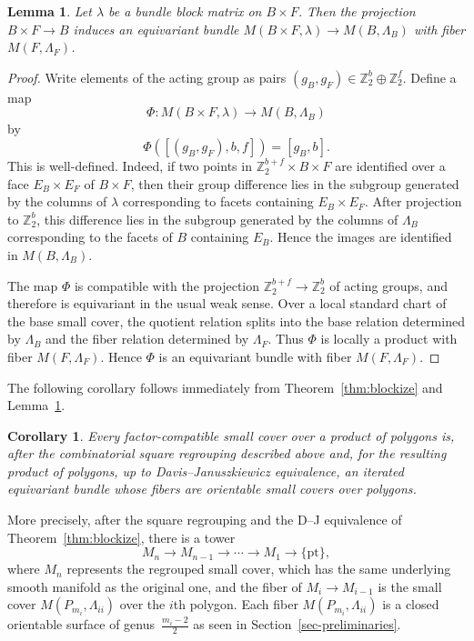 \documentclass{amsart}
\newtheorem{lemma}[theorem]{Lemma}
\newtheorem{corollary}[theorem]{Corollary}
\numberwithin{equation}{section}
\theoremstyle{definition}
\theoremstyle{remark}
\newcommand{\Z}{\mathbb Z}
\begin{document}
\begin{lemma}\label{lem:block-bundle-criterion}
    Let $\lambda$ be a bundle block matrix on $B\times F$.
    Then the projection $B\times F\to B$ induces an equivariant bundle $M(B\times F,\lambda) \to M(B,\Lambda_B)$ with fiber $M(F,\Lambda_F)$.
\end{lemma}

\begin{proof}
    Write elements of the acting group as pairs $(g_B,g_F)\in \Z_2^b\oplus\Z_2^f$.
    Define a map
    $$
        \Phi\colon M(B\times F,\lambda)\longrightarrow M(B,\Lambda_B)
    $$
    by
    $$
        \Phi([(g_B,g_F),b,f])=[g_B,b].
    $$
    This is well-defined.
    Indeed, if two points in $\Z_2^{b+f}\times B\times F$ are identified over a face $E_B\times E_F$ of $B\times F$, then their group difference lies in the subgroup generated by the columns of $\lambda$ corresponding to facets containing $E_B\times E_F$.
    After projection to $\Z_2^b$, this difference lies in the subgroup generated by the columns of $\Lambda_B$ corresponding to the facets of $B$ containing $E_B$.
    Hence the images are identified in $M(B,\Lambda_B)$.
    
    The map $\Phi$ is compatible with the projection $\Z_2^{b+f}\to \Z_2^b$ of acting groups, and therefore is equivariant in the usual weak sense.
    Over a local standard chart of the base small cover, the quotient relation splits into the base relation determined by $\Lambda_B$ and the fiber relation determined by $\Lambda_F$.
    Thus $\Phi$ is locally a product with fiber $M(F,\Lambda_F)$.
    Hence $\Phi$ is an equivariant bundle with fiber $M(F,\Lambda_F)$.
\end{proof}

The following corollary follows immediately from Theorem~\ref{thm:blockize} and Lemma~\ref{lem:block-bundle-criterion}.
\begin{corollary} \label{cor:iterated-equivariant-bundle}
    Every factor-compatible small cover over a product of polygons is, after the combinatorial square regrouping described above and, for the resulting product of polygons, up to Davis--Januszkiewicz equivalence, an iterated equivariant bundle whose fibers are orientable small covers over polygons.
\end{corollary}

More precisely, after the square regrouping and the D--J equivalence of Theorem~\ref{thm:blockize}, there is a tower
$$
    M_n\longrightarrow M_{n-1}\longrightarrow\cdots \longrightarrow M_1\longrightarrow \{\mathrm{pt}\},
$$
where $M_n$ represents the regrouped small cover, which has the same underlying smooth manifold as the original one, and the fiber of $M_i\to M_{i-1}$ is the small cover $M(P_{m_i},\Lambda_{ii})$ over the $i$th polygon.
Each fiber $M(P_{m_i},\Lambda_{ii})$ is a closed orientable surface of genus~$\frac{m_i-2}{2}$ as seen in Section~\ref{sec-preliminaries}.
\end{document}
